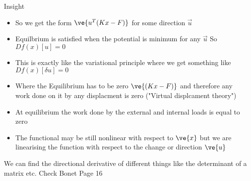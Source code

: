 	\begin{frame}{Insight}
		\begin{itemize}
			\item So we get the form $\ve{u^T(Kx-F)}$ for some direction $\vec{u}$
			\item Equilbrium is satisfied when the potential is minimum for any $\vec{u}$ So $Df(x)[u] =0$
			\item This is exactly like the variational principle where we get something like $Df(x)[\delta u] =0$
			\item Where the Equilibrium has to be zero  $\ve{(Kx-F)}$ and therefore any work done on it by any displacment is zero ("Virtual displcament theory")
			\item At equilibrium the work done by the external and internal loads is equal to zero
			\item The functional may be still nonlinear with respect to $\ve{x}$ but we are linearising the function with respect to the change or direction $\ve{u}$ 
		\end{itemize}
	\end{frame}

	\begin{frame}
		 We can find the directional derivative of different things like the determinant of a matrix etc. Check Bonet Page 16
	\end{frame}
